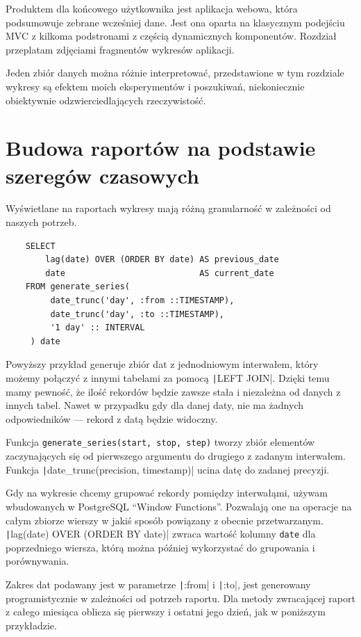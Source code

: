 \documentclass[openright]{xmgr}
\begin{document}
    Produktem dla końcowego użytkownika jest aplikacja webowa, która podsumowuje zebrane wcześniej dane.
    Jest ona oparta na klasycznym podejściu MVC z kilkoma podstronami z częścią dynamicznych komponentów.
    Rozdział przeplatam zdjęciami fragmentów wykresów aplikacji.

    Jeden zbiór danych można różnie interpretować, przedstawione w tym rozdziale wykresy
    są efektem moich eksperymentów i poszukiwań, niekoniecznie obiektywnie odzwierciedlających rzeczywistość.

    \section{Budowa raportów na podstawie szeregów czasowych}

    Wyświetlane na raportach wykresy mają różną granularność w zależności od naszych potrzeb.

    \begin{verbatim}
    SELECT
        lag(date) OVER (ORDER BY date) AS previous_date
        date                           AS current_date
    FROM generate_series(
         date_trunc('day', :from ::TIMESTAMP),
         date_trunc('day', :to ::TIMESTAMP),
         '1 day' :: INTERVAL
     ) date
    \end{verbatim}

    Powyższy przykład generuje zbiór dat z jednodniowym interwałem,
    który możemy połączyć z innymi tabelami za pomocą \texttt|LEFT JOIN|.
    Dzięki temu mamy pewność, że ilość rekordów będzie zawsze stała i niezależna od danych z innych tabel.
    Nawet w przypadku gdy dla danej daty, nie ma żadnych odpowiedników --- rekord z datą będzie widoczny.

    Funkcja \texttt{generate_series(start, stop, step)} tworzy zbiór elementów
    zaczynających się od pierwszego argumentu do drugiego z zadanym interwałem.
    Funkcja \texttt|date_trunc(precision, timestamp)| ucina datę do zadanej precyzji.

    Gdy na wykresie chcemy grupować rekordy pomiędzy interwałąmi, używam wbudowanych w PostgreSQL ``Window Functions''\cite{postgresql:window-function}.
    Pozwalają one na operacje na całym zbiorze wierszy w jakiś sposób powiązany z obecnie przetwarzanym.
    \texttt|lag(date) OVER (ORDER BY date)| zwraca wartość kolumny \verb|date| dla poprzedniego wiersza,
    którą można później wykorzystać do grupowania i porównywania.

    Zakres dat podawany jest w parametrze \texttt|:from| i \texttt|:to|,
    jest generowany programistycznie w zależności od potrzeb raportu.
    Dla metody zwracającej raport z całego miesiąca oblicza się pierwszy i ostatni jego dzień, jak w poniższym przykładzie.
\end{document}
